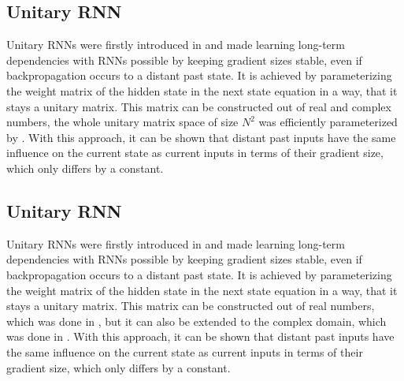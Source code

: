\documentclass[draft,final]{vutinfth} %
\begin{document}
    \subsection{Unitary RNN} \label{Unitary RNN}
    Unitary RNNs were firstly introduced in \cite{UnitaryRNNs} and made learning long-term dependencies with RNNs possible by keeping gradient sizes stable, even if backpropagation occurs to a distant past state.
    It is achieved by parameterizing the weight matrix of the hidden state in the next state equation in a way, that it stays a unitary matrix.
    This matrix can be constructed out of real and complex numbers, the whole unitary matrix space of size $N^2$ was efficiently parameterized by \cite{EfficientUnitaryRNNs}.
    With this approach, it can be shown that distant past inputs have the same influence on the current state as current inputs in terms of their gradient size, which only differs by a constant.

    \subsection{Unitary RNN} \label{Unitary RNN}
    Unitary RNNs were firstly introduced in \cite{UnitaryRNNs} and made learning long-term dependencies with RNNs possible by keeping gradient sizes stable, even if backpropagation occurs to a distant past state.
    It is achieved by parameterizing the weight matrix of the hidden state in the next state equation in a way, that it stays a unitary matrix.
    This matrix can be constructed out of real numbers, which was done in \cite{UnitaryRNNs}, but it can also be extended to the complex domain, which was done in \cite{EfficientUnitaryRNNs}.
    With this approach, it can be shown that distant past inputs have the same influence on the current state as current inputs in terms of their gradient size, which only differs by a constant.
\end{document}
